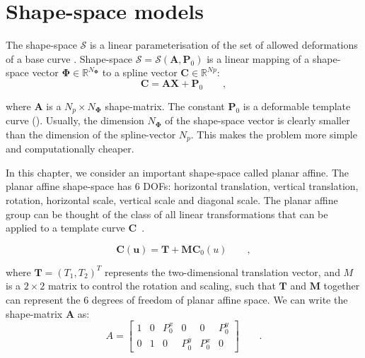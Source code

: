 \section{Shape-space models}
\label{sec:ssm}

The shape-space $\mathcal{S}$ is a linear parameterisation of the set of allowed
deformations of a base curve \cite{blake1998active}. Shape-space
$\mathcal{S} = \mathcal{S}(\mathbf{A},\mathbf{P}_0)$ is a linear mapping of a shape-space
vector $\mathbf{\Phi} \in  \mathbb{R}^{N_{\mathbf{\Phi}}}$ to a spline vector $\mathbf{C} \in
\mathbb{R}^{Np}$:
\begin{equation}
  \label{eq:4.16}
  \mathbf{C} = \mathbf{A}\mathbf{X}+ \mathbf{P}_0\qquad,
\end{equation}

where $\mathbf{A}$ is a $N_p \times N_{\mathbf{\Phi}}$ shape-matrix. The
constant  $\mathbf{P}_0$ is a deformable template curve (\cite{blake1998active}). Usually, the
dimension $N_{\mathbf{\Phi}}$ of the shape-space vector is clearly
smaller than the dimension of the spline-vector $N_p$. This makes the
problem more simple and computationally cheaper.

In this chapter, we consider an important shape-space called planar
affine. The planar affine shape-space has 6 DOFs: horizontal
translation, vertical translation, rotation, horizontal scale,
vertical scale and diagonal scale. The planar affine group can be
thought of the class of all linear transformations that can be applied
to a template curve $\mathbf{C}$~\cite{blake1998active}. 

\begin{equation}
  \label{eq:4.17}
  \mathbf{C(u)} = \mathbf{T} + \mathbf{M} \mathbf{C}_0(u)\qquad,
\end{equation}

where $\mathbf{T} = (T_1, T_2)^T$ represents the two-dimensional translation
vector, and $M$ is a $2 \times 2$ matrix to control the rotation and
scaling, such that $\mathbf{T}$ and $\mathbf{M}$ together can represent the 6 degrees of
freedom of planar affine space. We can write the shape-matrix $\mathbf{A}$
as:
\begin{equation}
  \label{eq:4.18}
  A =
  \begin{bmatrix}
    1 & 0 & P_0^x & 0 & 0 & P_0^y\\
    0 & 1 & 0 & P_0^y & P_0^x & 0
  \end{bmatrix}\qquad. 
\end{equation}


